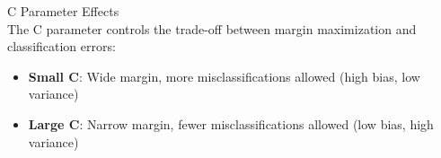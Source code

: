 \begin{concept}{C Parameter Effects}\\
The C parameter controls the trade-off between margin maximization and classification errors:
\begin{itemize}
    \item \textbf{Small C}: Wide margin, more misclassifications allowed (high bias, low variance)
    \item \textbf{Large C}: Narrow margin, fewer misclassifications allowed (low bias, high variance)
\end{itemize}
\end{concept}

